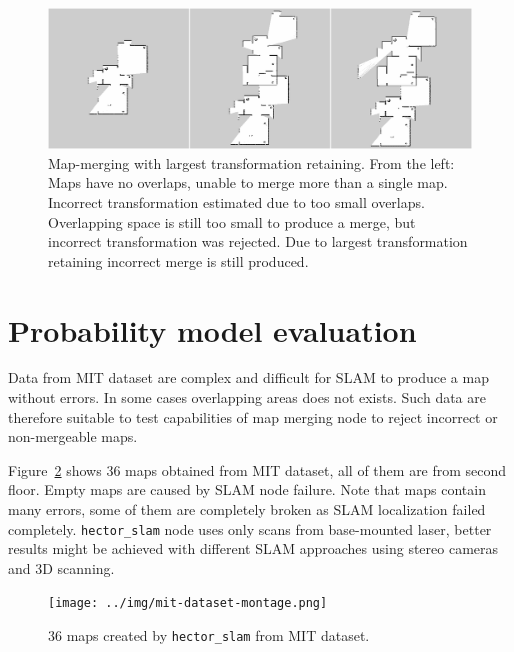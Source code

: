 \begin{figure}
    \centering
    \includegraphics[width=5.71in]{../img/retaining-largest-transformation-montage.png}
    \caption{Map-merging with largest transformation retaining. From the left: Maps have no overlaps, unable to merge more than a single map. Incorrect transformation estimated due to too small overlaps. Overlapping space is still too small to produce a merge, but incorrect transformation was rejected. Due to largest transformation retaining incorrect merge is still produced.}
    \label{fig:retaining-largest-transformation-montage}
\end{figure}

\section{Probability model evaluation}
\label{sec:probability-model-evaluation}

Data from \gls{MIT} dataset are complex and difficult for \gls{SLAM} to produce a map without errors. In some cases overlapping areas does not exists. Such data are therefore suitable to test capabilities of map merging node to reject incorrect or non-mergeable maps.

Figure~\ref{fig:probability-model-evaluation-montage} shows $36$ maps obtained from \gls{MIT} dataset, all of them are from second floor. Empty maps are caused by \gls{SLAM} node failure. Note that maps contain many errors, some of them are completely broken as \gls{SLAM} localization failed completely. \texttt{hector\_slam} node uses only scans from base-mounted laser, better results might be achieved with different \gls{SLAM} approaches using stereo cameras and 3D scanning.

\begin{figure}
    \centering
    \texttt{[image: ../img/mit-dataset-montage.png]}
    \caption{$36$ maps created by \texttt{hector\_slam} from \gls{MIT} dataset.}
    \label{fig:probability-model-evaluation-montage}
\end{figure}

